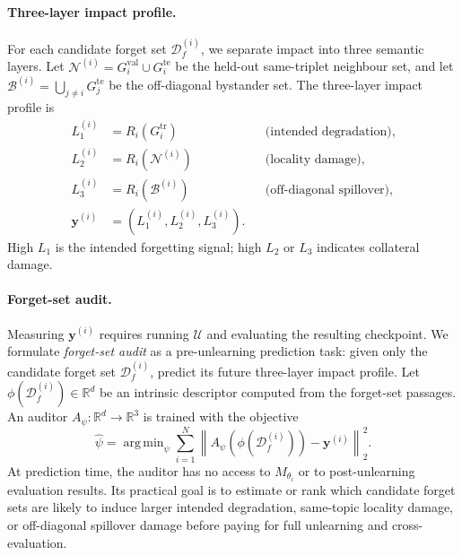 \documentclass[11pt]{article}
\newcommand{\R}{\mathbb{R}}
\newcommand{\Df}{\mathcal{D}_f}
\newcommand{\Lone}{L_1}
\newcommand{\Ltwo}{L_2}
\newcommand{\Lthree}{L_3}
\DeclareMathOperator*{\argmin}{arg\,min}
\begin{document}
\paragraph{Three-layer impact profile.}
For each candidate forget set $\Df^{(i)}$, we separate impact into three
semantic layers. Let
$\mathcal{N}^{(i)}=G_i^{\mathrm{val}}\cup G_i^{\mathrm{te}}$ be the held-out
same-triplet neighbour set, and let
$\mathcal{B}^{(i)}=\bigcup_{j\neq i}G_j^{\mathrm{te}}$ be the off-diagonal
bystander set. The three-layer impact profile is
\begin{align}
    \Lone^{(i)} &= R_i(G_i^{\mathrm{tr}})
    &&\text{(intended degradation)},\\
    \Ltwo^{(i)} &= R_i(\mathcal{N}^{(i)})
    &&\text{(locality damage)},\\
    \Lthree^{(i)} &= R_i(\mathcal{B}^{(i)})
    &&\text{(off-diagonal spillover)},\\
    \mathbf{y}^{(i)}
    &=\left(\Lone^{(i)},\Ltwo^{(i)},\Lthree^{(i)}\right).
\end{align}
High $\Lone$ is the intended forgetting signal; high $\Ltwo$ or $\Lthree$
indicates collateral damage.

\paragraph{Forget-set audit.}
Measuring $\mathbf{y}^{(i)}$ requires running $\mathcal{U}$ and evaluating the
resulting checkpoint. We formulate \emph{forget-set audit} as a
pre-unlearning prediction task: given only the candidate forget set
$\Df^{(i)}$, predict its future three-layer impact profile. Let
$\phi(\Df^{(i)})\in\R^d$ be an intrinsic descriptor computed from the
forget-set passages. An auditor
$A_{\psi}: \R^d \rightarrow \R^3$ is trained with the objective
\begin{equation}
    \hat{\psi}
    =
    \argmin_{\psi}
    \sum_{i=1}^{N}
    \left\|
    A_{\psi}\!\left(\phi(\Df^{(i)})\right)
    -
    \mathbf{y}^{(i)}
    \right\|_2^2.
\end{equation}
At prediction time, the auditor has no access to $M_{\theta_i}$ or to
post-unlearning evaluation results. Its practical goal is to estimate or rank
which candidate forget sets are likely to induce larger intended degradation,
same-topic locality damage, or off-diagonal spillover damage before paying for
full unlearning and cross-evaluation.

\end{document}
